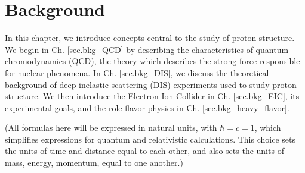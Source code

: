 \chapter{Background}
\label{ch.bkg}


In this chapter, we introduce concepts central to the study of proton structure. We begin in Ch. \ref{sec.bkg_QCD} by describing the characteristics of quantum chromodynamics (QCD), the theory which describes the strong force responsible for nuclear phenomena. In Ch. \ref{sec.bkg_DIS}, we discuss the theoretical background of deep-inelastic scattering (DIS) experiments used to study proton structure. We then introduce the Electron-Ion Collider in Ch. \ref{sec.bkg_EIC}, its experimental goals, and the role flavor physics in Ch. \ref{sec.bkg_heavy_flavor}.


(All formulas here will be expressed in natural units, with $\hbar=c=1$, which simplifies expressions for quantum and relativistic calculations. This choice sets the units of time and distance equal to each other, and also sets the units of mass, energy, momentum, equal to one another.)


